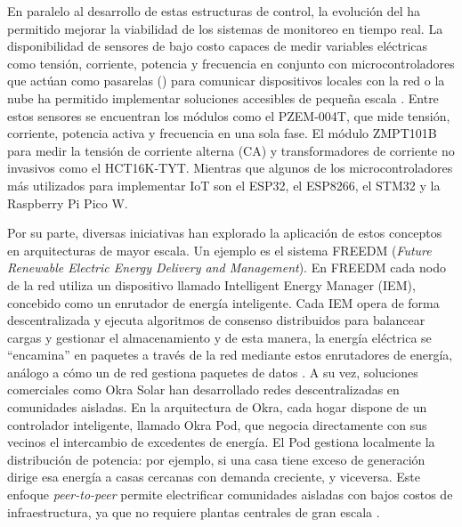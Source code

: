 En paralelo al desarrollo de estas estructuras de control, la evolución del  ha permitido mejorar la viabilidad de los sistemas de monitoreo en tiempo real. La disponibilidad de sensores de bajo costo capaces de medir variables eléctricas como tensión, corriente, potencia y frecuencia en conjunto con microcontroladores que actúan como pasarelas () para comunicar dispositivos locales con la red o la nube ha permitido implementar soluciones accesibles de pequeña escala \cite{malviya2023_iot_energy_meter}. Entre estos sensores se encuentran los módulos como el PZEM-004T, que mide tensión, corriente, potencia activa y frecuencia en una sola fase. El módulo ZMPT101B para medir la tensión de corriente alterna (CA) y transformadores de corriente no invasivos como el HCT16K-TYT. Mientras que algunos de los microcontroladores más utilizados para implementar  IoT son el ESP32, el ESP8266, el STM32 y la Raspberry Pi Pico W.

Por su parte, diversas iniciativas han explorado la aplicación de estos conceptos en arquitecturas de mayor escala. Un ejemplo es el sistema FREEDM (\textit{Future Renewable Electric Energy Delivery and Management}). En FREEDM cada nodo de la red utiliza un dispositivo llamado Intelligent Energy Manager (IEM), concebido como un enrutador de energía inteligente. Cada IEM opera de forma descentralizada y ejecuta algoritmos de consenso distribuidos para balancear cargas y gestionar el almacenamiento y de esta manera, la energía eléctrica se ``encamina'' en paquetes a través de la red mediante estos enrutadores de energía, análogo a cómo un  de red gestiona paquetes de datos \cite{hussain2019_energy_internet}.
A su vez, soluciones comerciales como Okra Solar han desarrollado redes  descentralizadas en comunidades aisladas. En la arquitectura de Okra, cada hogar dispone de un controlador inteligente, llamado Okra Pod, que negocia directamente con sus vecinos el intercambio de excedentes de energía. El Pod gestiona localmente la distribución de potencia: por ejemplo, si una casa tiene exceso de generación dirige esa energía a casas cercanas con demanda creciente, y viceversa. Este enfoque \textit{peer-to-peer} permite electrificar comunidades aisladas con bajos costos de infraestructura, ya que no requiere plantas centrales de gran escala \cite{okra_mesh_grid}.

